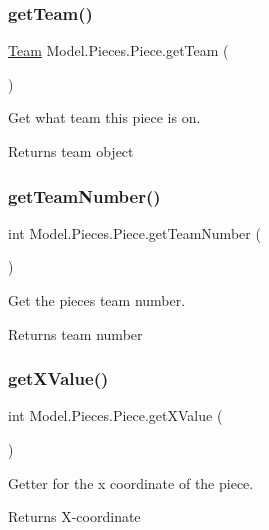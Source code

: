 \subsubsection{\texorpdfstring{get\+Team()}{getTeam()}}
{\footnotesize\ttfamily \hyperlink{class_model_1_1_team}{Team} Model.\+Pieces.\+Piece.\+get\+Team (\begin{DoxyParamCaption}{ }\end{DoxyParamCaption})}

Get what team this piece is on.

\begin{DoxyReturn}{Returns}
team object 
\end{DoxyReturn}
\hypertarget{class_model_1_1_pieces_1_1_piece_a86728adbff75375d1b704acfb3dfd994}{}\label{class_model_1_1_pieces_1_1_piece_a86728adbff75375d1b704acfb3dfd994} 
\subsubsection{\texorpdfstring{get\+Team\+Number()}{getTeamNumber()}}
{\footnotesize\ttfamily int Model.\+Pieces.\+Piece.\+get\+Team\+Number (\begin{DoxyParamCaption}{ }\end{DoxyParamCaption})}

Get the piece\textquotesingle{}s team number. \begin{DoxyReturn}{Returns}
team number 
\end{DoxyReturn}
\hypertarget{class_model_1_1_pieces_1_1_piece_a7390da3b01de7a30694042ad77bd2ee4}{}\label{class_model_1_1_pieces_1_1_piece_a7390da3b01de7a30694042ad77bd2ee4} 
\subsubsection{\texorpdfstring{get\+X\+Value()}{getXValue()}}
{\footnotesize\ttfamily int Model.\+Pieces.\+Piece.\+get\+X\+Value (\begin{DoxyParamCaption}{ }\end{DoxyParamCaption})}

Getter for the x coordinate of the piece. \begin{DoxyReturn}{Returns}
X-\/coordinate 
\end{DoxyReturn}
\hypertarget{class_model_1_1_pieces_1_1_piece_ae211bc6f3f2adf995de3bfa1ab5dfc7b}{}\label{class_model_1_1_pieces_1_1_piece_ae211bc6f3f2adf995de3bfa1ab5dfc7b} 
